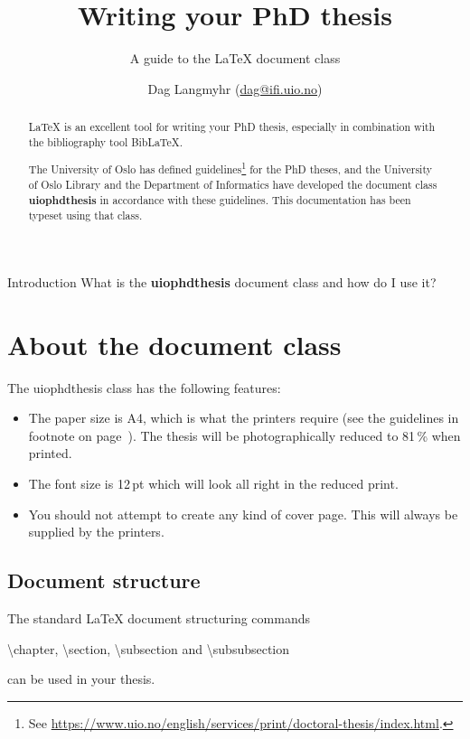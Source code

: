 \documentclass[UKenglish, thumbmarks]{uiophdthesis}
\title{Writing your PhD thesis}
\subtitle{A guide to the \LaTeX{} document class \pb{uiophdthesis}}
\author{Dag Langmyhr (\url{dag@ifi.uio.no})}
\newcommand{\bsl}{\textbackslash}
\newcommand{\p}[1]{\textsf{#1}}
\newcommand{\pb}[1]{\textbf{\p{#1}}}
\newcommand{\pcmd}[1]{\p{\bsl #1}}
\begin{document}
\uiomasterfp[kind=Documentation, compact, nosp, colour=grey,
  date=\today]

\frontmatter
\maketitle

\begin{abstract}
\LaTeX{} is an excellent tool for writing your PhD thesis, especially in
combination with the bibliography tool Bib\LaTeX.

The University of Oslo has defined guidelines\footnote{\label{guidelines}See
  \url{https://www.uio.no/english/services/print/doctoral-thesis/index.html}.}
for the PhD theses, and 
the University of Oslo Library and the Department of Informatics have
developed the document class \pb{uiophdthesis} in accordance with these
guidelines. This documentation has been typeset using that class.
\end{abstract}

\tableofcontents

\mainmatter
\begin{uioseparatorpage}{Introduction\label{intro-part}}
  What is the \pb{uiophdthesis} document class and how do I use it?
\end{uioseparatorpage}

\chapter{About the document class}
The \p{uiophdthesis} class has the following features:
\begin{itemize}
\item The paper size is A4, which is what the printers require (see
  the guidelines in footnote on page~\pageref{guidelines}).
  The thesis will be photographically reduced to
  81\,\% when printed.

\item The font size is 12\,pt which will look all right in the reduced
  print.

\item You should not attempt to create any kind of cover page. This
  will always be supplied by the printers.
\end{itemize}

\section{Document structure}
The standard \LaTeX{} document structuring commands
\begin{center}
  \pcmd{chapter}, \pcmd{section}, \pcmd{subsection} and \pcmd{subsubsection}
\end{center}
can be used in your thesis.
\end{document}
